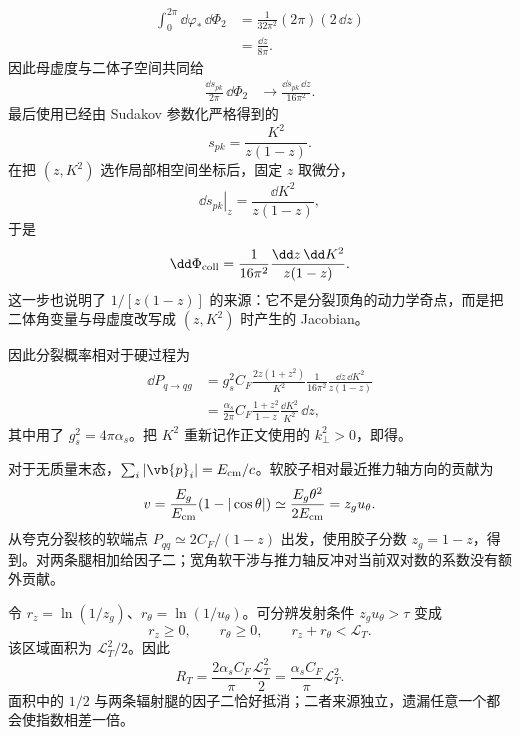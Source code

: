 \begin{derivation}[夸克共线发射的分裂概率]
\begin{align*}
 \int_0^{2\pi}\dd\varphi_*\,\dd\Phi_2
 &=\frac{1}{32\pi^2}(2\pi)(2\,\dd z)\\
 &=\frac{\dd z}{8\pi}.
\end{align*}
因此母虚度与二体子空间共同给
\begin{align*}
 \frac{\dd s_{pk}}{2\pi}\,\dd\Phi_2
 &\longrightarrow
 \frac{\dd s_{pk}\,\dd z}{16\pi^2}.
\end{align*}
最后使用已经由 Sudakov 参数化严格得到的
\begin{equation*}
 s_{pk}=\frac{K^2}{z(1-z)}.
\end{equation*}
在把 $(z,K^2)$ 选作局部相空间坐标后，固定 $z$ 取微分，
\begin{equation*}
 \left.\dd s_{pk}\right|_z
 =\frac{\dd K^2}{z(1-z)},
\end{equation*}
于是
\begin{equation*}
 {
 \dd\Phi_{\rm coll}
 =\frac{1}{16\pi^2}
 \frac{\dd z\,\dd K^2}{z(1-z)}.}
\end{equation*}
这一步也说明了 $1/[z(1-z)]$ 的来源：它不是分裂顶角的动力学奇点，而是把二体角变量与母虚度改写成 $(z,K^2)$ 时产生的 Jacobian。

因此分裂概率相对于硬过程为
\begin{align*}
 \dd P_{q\to qg}
 &=g_s^2C_F\frac{2z(1+z^2)}{K^2}
 \frac{1}{16\pi^2}
 \frac{\dd z\,\dd K^2}{z(1-z)}\\
 &=\frac{\alpha_s}{2\pi}
 C_F\frac{1+z^2}{1-z}
 \frac{\dd K^2}{K^2}\,\dd z,
\end{align*}
其中用了 $g_s^2=4\pi\alpha_s$。把 $K^2$ 重新记作正文使用的 $k_\perp^2>0$，即得。
\end{derivation}

\begin{derivation}[双对数的三角形积分区域]
对于无质量末态，$\sum_i|\vb{p}_i|=E_{\rm cm}/c$。软胶子相对最近推力轴方向的贡献为
\begin{equation*}
 v=\frac{E_g}{E_{\rm cm}}(1-|\cos\theta|)
 \simeq\frac{E_g\theta^2}{2E_{\rm cm}}=z_gu_\theta.
\end{equation*}
从夸克分裂核的软端点 $P_{qq}\simeq2C_F/(1-z)$ 出发，使用胶子分数 $z_g=1-z$，得到。对两条腿相加给因子二；宽角软干涉与推力轴反冲对当前双对数的系数没有额外贡献。

令 $r_z=\ln(1/z_g)$、$r_\theta=\ln(1/u_\theta)$。可分辨发射条件 $z_gu_\theta>\tau$ 变成
\begin{equation*}
 r_z\geq0,\qquad r_\theta\geq0,\qquad r_z+r_\theta<\mathcal L_T.
\end{equation*}
该区域面积为 $\mathcal L_T^2/2$。因此
\begin{equation*}
 R_T=\frac{2\alpha_sC_F}{\pi}\frac{\mathcal L_T^2}{2}
 =\frac{\alpha_sC_F}{\pi}\mathcal L_T^2.
\end{equation*}
面积中的 $1/2$ 与两条辐射腿的因子二恰好抵消；二者来源独立，遗漏任意一个都会使指数相差一倍。
\end{derivation}

